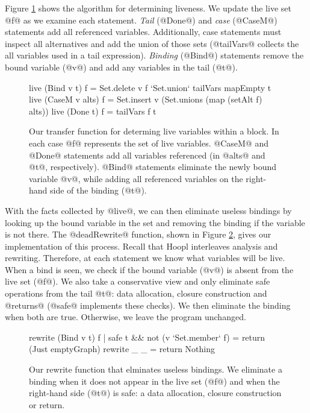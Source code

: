 \documentclass[12pt]{report}
\begin{document}
Figure \ref{ref_fig_liveTransfer} shows the algorithm for determining
liveness. We update the live set @f@ as we examine each
statement. \emph{Tail} (@Done@) and \emph{case} (@CaseM@) statements
add all referenced variables. Additionally, case statements must
inspect all alternatives and add the union of those sets (@tailVars@
collects the all variables used in a tail expression). \emph{Binding}
(@Bind@) statements remove the bound variable (@v@) and add any
variables in the tail (@t@).

\begin{figure}[h]
\begin{code}
live (Bind v t) f = Set.delete v f  `Set.union` tailVars mapEmpty t
live (CaseM v alts) f = Set.insert v (Set.unions (map (setAlt f) alts))
live (Done t) f = tailVars f t
\end{code}
\caption{Our transfer function for determing live variables within a block. In
each case @f@ represents the set of live variables. @CaseM@ and @Done@ statements
add all variables referenced (in @alts@ and @t@, respectively). @Bind@ statements
eliminate the newly bound variable @v@, while adding all referenced variables on the
right-hand side of the binding (@t@).}
\label{ref_fig_liveTransfer}
\end{figure}

With the facts collected by @live@, we can then eliminate useless
bindings by looking up the bound variable in the set and removing the
binding if the variable is not there. The @deadRewrite@ function,
shown in Figure \ref{ref_fig_deadRewrite}, gives our implementation of
this process. Recall that Hoopl interleaves analysis and rewriting.
Therefore, at each statement we know what variables will be live. When
a bind is seen, we check if the bound variable (@v@) is absent from
the live set (@f@). We also take a conservative view and only
eliminate safe operations from the tail @t@: data allocation, closure
construction and @returns@ (@safe@ implements these checks). We then
eliminate the binding when both are true. Otherwise, we leave the
program unchanged.

\begin{figure}[h]
\begin{code}
rewrite (Bind v t) f
  | safe t && not (v `Set.member` f) = return (Just emptyGraph)
rewrite _ _ = return Nothing
\end{code}
\caption{Our rewrite function that elminates useless bindings. We eliminate a
binding when it does not appear in the live set (@f@) and when the right-hand side
(@t@) is safe: a data allocation, closure construction or return.}
\label{ref_fig_deadRewrite}
\end{figure}
\end{document}
